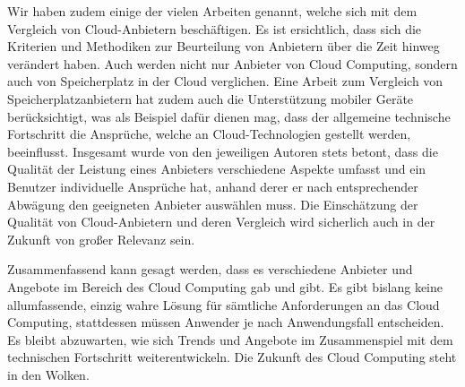Wir haben zudem einige der vielen Arbeiten genannt, welche sich mit dem Vergleich von Cloud-Anbietern beschäftigen. 
Es ist ersichtlich, dass sich die Kriterien und Methodiken zur Beurteilung von Anbietern über die Zeit hinweg verändert haben. 
Auch werden nicht nur Anbieter von Cloud Computing, sondern auch von Speicherplatz in der Cloud verglichen. 
Eine Arbeit zum Vergleich von Speicherplatzanbietern hat zudem auch die Unterstützung mobiler Geräte berücksichtigt, was als Beispiel dafür dienen mag, dass der allgemeine technische Fortschritt die Ansprüche, welche an Cloud-Technologien gestellt werden, beeinflusst. 
Insgesamt wurde von den jeweiligen Autoren stets betont, dass die Qualität der Leistung eines Anbieters verschiedene Aspekte umfasst und ein Benutzer individuelle Ansprüche hat, anhand derer er nach entsprechender Abwägung den geeigneten Anbieter auswählen muss. 
Die Einschätzung der Qualität von Cloud-Anbietern und deren Vergleich wird sicherlich auch in der Zukunft von großer Relevanz sein. 


Zusammenfassend kann gesagt werden, dass es verschiedene Anbieter und Angebote im Bereich des Cloud Computing gab und gibt. 
Es gibt bislang keine allumfassende, einzig wahre Lösung für sämtliche Anforderungen an das Cloud Computing, stattdessen müssen Anwender je nach Anwendungsfall entscheiden. 
Es bleibt abzuwarten, wie sich Trends und Angebote im Zusammenspiel mit dem technischen Fortschritt weiterentwickeln. 
Die Zukunft des Cloud Computing steht in den Wolken.